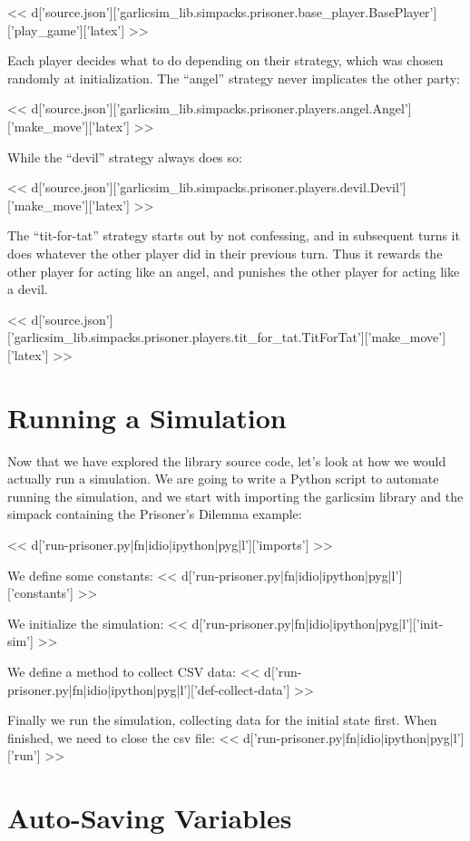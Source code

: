 \documentclass[a4paper]{tufte-handout}
\begin{document}
<< d['source.json']['garlicsim_lib.simpacks.prisoner.base_player.BasePlayer']['play_game']['latex'] >>

Each player decides what to do depending on their strategy, which was chosen
randomly at initialization. The ``angel'' strategy never implicates the other
party:

<< d['source.json']['garlicsim_lib.simpacks.prisoner.players.angel.Angel']['make_move']['latex'] >>

While the ``devil'' strategy always does so:

<< d['source.json']['garlicsim_lib.simpacks.prisoner.players.devil.Devil']['make_move']['latex'] >>

The ``tit-for-tat'' strategy starts out by not confessing, and in subsequent
turns it does whatever the other player did in their previous turn. Thus it
rewards the other player for acting like an angel, and punishes the other
player for acting like a devil.

<< d['source.json']['garlicsim_lib.simpacks.prisoner.players.tit_for_tat.TitForTat']['make_move']['latex'] >>

\section{Running a Simulation}

Now that we have explored the library source code, let's look at how we would
actually run a simulation. We are going to write a Python script to automate
running the simulation, and we start with importing the garlicsim library and
the simpack containing the Prisoner's Dilemma example:

<< d['run-prisoner.py|fn|idio|ipython|pyg|l']['imports'] >>

We define some constants:
<< d['run-prisoner.py|fn|idio|ipython|pyg|l']['constants'] >>

We initialize the simulation:
<< d['run-prisoner.py|fn|idio|ipython|pyg|l']['init-sim'] >>

We define a method to collect CSV data:
<< d['run-prisoner.py|fn|idio|ipython|pyg|l']['def-collect-data'] >>

Finally we run the simulation, collecting data for the initial state first. When finished, we need to close the csv file:
<< d['run-prisoner.py|fn|idio|ipython|pyg|l']['run'] >>

\section{Auto-Saving Variables}
\end{document}
